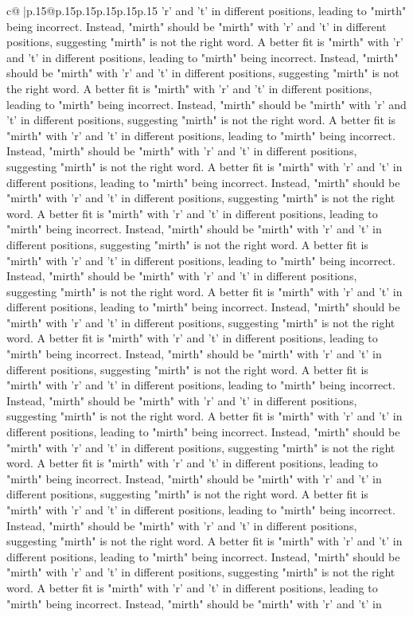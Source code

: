 \documentclass{article}
\begin{document}
{\begin{supertabular}{c@{$\;$}|p{.15\linewidth}@{}p{.15\linewidth}p{.15\linewidth}p{.15\linewidth}p{.15\linewidth}p{.15\linewidth}}
{{{'r' and 't' in different positions, leading to "mirth" being incorrect. Instead, "mirth" should be "mirth" with 'r' and 't' in different positions, suggesting "mirth" is not the right word. A better fit is "mirth" with 'r' and 't' in different positions, leading to "mirth" being incorrect. Instead, "mirth" should be "mirth" with 'r' and 't' in different positions, suggesting "mirth" is not the right word. A better fit is "mirth" with 'r' and 't' in different positions, leading to "mirth" being incorrect. Instead, "mirth" should be "mirth" with 'r' and 't' in different positions, suggesting "mirth" is not the right word. A better fit is "mirth" with 'r' and 't' in different positions, leading to "mirth" being incorrect. Instead, "mirth" should be "mirth" with 'r' and 't' in different positions, suggesting "mirth" is not the right word. A better fit is "mirth" with 'r' and 't' in different positions, leading to "mirth" being incorrect. Instead, "mirth" should be "mirth" with 'r' and 't' in different positions, suggesting "mirth" is not the right word. A better fit is "mirth" with 'r' and 't' in different positions, leading to "mirth" being incorrect. Instead, "mirth" should be "mirth" with 'r' and 't' in different positions, suggesting "mirth" is not the right word. A better fit is "mirth" with 'r' and 't' in different positions, leading to "mirth" being incorrect. Instead, "mirth" should be "mirth" with 'r' and 't' in different positions, suggesting "mirth" is not the right word. A better fit is "mirth" with 'r' and 't' in different positions, leading to "mirth" being incorrect. Instead, "mirth" should be "mirth" with 'r' and 't' in different positions, suggesting "mirth" is not the right word. A better fit is "mirth" with 'r' and 't' in different positions, leading to "mirth" being incorrect. Instead, "mirth" should be "mirth" with 'r' and 't' in different positions, suggesting "mirth" is not the right word. A better fit is "mirth" with 'r' and 't' in different positions, leading to "mirth" being incorrect. Instead, "mirth" should be "mirth" with 'r' and 't' in different positions, suggesting "mirth" is not the right word. A better fit is "mirth" with 'r' and 't' in different positions, leading to "mirth" being incorrect. Instead, "mirth" should be "mirth" with 'r' and 't' in different positions, suggesting "mirth" is not the right word. A better fit is "mirth" with 'r' and 't' in different positions, leading to "mirth" being incorrect. Instead, "mirth" should be "mirth" with 'r' and 't' in different positions, suggesting "mirth" is not the right word. A better fit is "mirth" with 'r' and 't' in different positions, leading to "mirth" being incorrect. Instead, "mirth" should be "mirth" with 'r' and 't' in different positions, suggesting "mirth" is not the right word. A better fit is "mirth" with 'r' and 't' in different positions, leading to "mirth" being incorrect. Instead, "mirth" should be "mirth" with 'r' and 't' in different positions, suggesting "mirth" is not the right word. A better fit is "mirth" with 'r' and 't' in different positions, leading to "mirth" being incorrect. Instead, "mirth" should be "mirth" with 'r' and 't' in }}}
\end{supertabular}}
\end{document}
